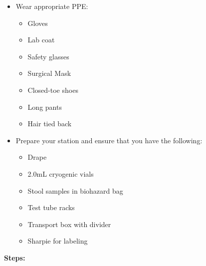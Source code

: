 \documentclass[
]{book}
\providecommand{\tightlist}{%
  \setlength{\itemsep}{0pt}\setlength{\parskip}{0pt}}
\begin{document}
\begin{itemize}
\tightlist
\item
  Wear appropriate PPE:

  \begin{itemize}
  \tightlist
  \item
    Gloves
  \item
    Lab coat
  \item
    Safety glasses
  \item
    Surgical Mask
  \item
    Closed-toe shoes
  \item
    Long pants
  \item
    Hair tied back
  \end{itemize}
\item
  Prepare your station and ensure that you have the following:

  \begin{itemize}
  \tightlist
  \item
    Drape
  \item
    2.0mL cryogenic vials
  \item
    Stool samples in biohazard bag
  \item
    Test tube racks
  \item
    Transport box with divider
  \item
    Sharpie for labeling
  \end{itemize}
\end{itemize}

\textbf{Steps:}
\end{document}
